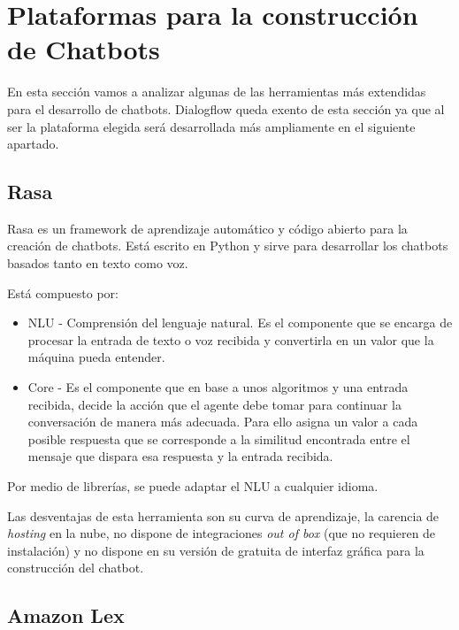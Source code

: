 
\section{Plataformas para la construcción de Chatbots}

En esta sección vamos a analizar algunas de las herramientas más extendidas para el desarrollo de chatbots. Dialogflow queda exento de esta sección ya que al ser la plataforma elegida será desarrollada más ampliamente en el siguiente apartado. \\


\newpage
\subsection{Rasa \cite{RasaWeb}} 

Rasa es un framework de aprendizaje automático y código abierto para la creación de chatbots. Está escrito en Python y sirve para desarrollar los chatbots basados tanto en texto como voz. \cite{rasa}

Está compuesto por:
\begin{itemize}
	\item 
	NLU - Comprensión del lenguaje natural. Es el componente que se encarga de procesar la entrada de texto o voz recibida y convertirla en un valor que la máquina pueda entender. 
	\item 
	Core - Es el componente que en base a unos algoritmos y una entrada recibida, decide la acción que el agente debe tomar para continuar la conversación de manera más adecuada. Para ello asigna un valor a cada posible respuesta que se corresponde a la similitud encontrada entre el mensaje que dispara esa respuesta y la entrada recibida. 
\end{itemize}

Por medio de librerías, se puede adaptar el NLU a cualquier idioma.

Las desventajas de esta herramienta son su curva de aprendizaje, la carencia de \textit{hosting} en la nube, no dispone de integraciones \textit{out of box} (que no requieren de instalación) y no dispone en su versión de gratuita de interfaz gráfica para la construcción del chatbot.
\newpage

\subsection{Amazon Lex \cite{AmazonLexWeb}}


